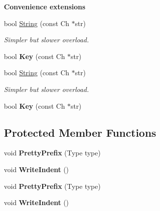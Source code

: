 \begin{Indent}{\bf Convenience extensions}\par
\begin{DoxyCompactItemize}
\item 
bool \hyperlink{class_pretty_writer_a7e85689355a827d273f272c26b447225}{String} (const Ch $\ast$str)\hypertarget{class_pretty_writer_a7e85689355a827d273f272c26b447225}{}\label{class_pretty_writer_a7e85689355a827d273f272c26b447225}

\begin{DoxyCompactList}\small\item\em Simpler but slower overload. \end{DoxyCompactList}\item 
bool {\bfseries Key} (const Ch $\ast$str)\hypertarget{class_pretty_writer_a4b2a2a6eef02c12d7a3fd77966bd4499}{}\label{class_pretty_writer_a4b2a2a6eef02c12d7a3fd77966bd4499}

\item 
bool \hyperlink{class_pretty_writer_a7e85689355a827d273f272c26b447225}{String} (const Ch $\ast$str)\hypertarget{class_pretty_writer_a7e85689355a827d273f272c26b447225}{}\label{class_pretty_writer_a7e85689355a827d273f272c26b447225}

\begin{DoxyCompactList}\small\item\em Simpler but slower overload. \end{DoxyCompactList}\item 
bool {\bfseries Key} (const Ch $\ast$str)\hypertarget{class_pretty_writer_a4b2a2a6eef02c12d7a3fd77966bd4499}{}\label{class_pretty_writer_a4b2a2a6eef02c12d7a3fd77966bd4499}

\end{DoxyCompactItemize}
\end{Indent}
\subsection*{Protected Member Functions}
\begin{DoxyCompactItemize}
\item 
void {\bfseries Pretty\+Prefix} (Type type)\hypertarget{class_pretty_writer_a09709ffa3b545e007631ecfd35029843}{}\label{class_pretty_writer_a09709ffa3b545e007631ecfd35029843}

\item 
void {\bfseries Write\+Indent} ()\hypertarget{class_pretty_writer_a6f244ecc94fd5b134d424033b1574b7e}{}\label{class_pretty_writer_a6f244ecc94fd5b134d424033b1574b7e}

\item 
void {\bfseries Pretty\+Prefix} (Type type)\hypertarget{class_pretty_writer_a09709ffa3b545e007631ecfd35029843}{}\label{class_pretty_writer_a09709ffa3b545e007631ecfd35029843}

\item 
void {\bfseries Write\+Indent} ()\hypertarget{class_pretty_writer_a6f244ecc94fd5b134d424033b1574b7e}{}\label{class_pretty_writer_a6f244ecc94fd5b134d424033b1574b7e}

\end{DoxyCompactItemize}

